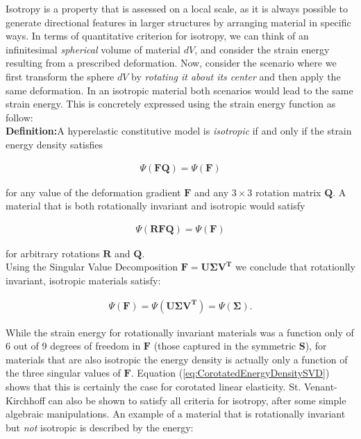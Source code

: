 Isotropy is a property that is assessed on a local scale, as it is always possible to generate directional features in larger structures by 
arranging material in specific ways. In terms of quantitative criterion for isotropy, we can think of an infinitesimal \textit{spherical} 
volume of material $dV$, and consider the strain energy resulting from a prescribed deformation. Now, consider the scenario where we first 
transform the sphere $dV$ by \textit{rotating it about its center} and then apply the same deformation. In an isotropic material both
scenarios would lead to the same strain energy. This is concretely expressed using the strain energy function as follow:\\

\textbf{Definition:}A hyperelastic constitutive model is \textit{isotropic} if and only if the strain energy density satisfies

\begin{gather*}
 \Psi(\boldsymbol{FQ}) = \Psi(\boldsymbol{F})
\end{gather*}

for any value of the deformation gradient $\boldsymbol{F}$ and any $3 \times 3$ rotation matrix $\boldsymbol{Q}$. A material that is both 
rotationally invariant and isotropic would satisfy

\begin{gather*}
 \Psi(\boldsymbol{RFQ})=\Psi(\boldsymbol{F})
\end{gather*}

for arbitrary rotations $\boldsymbol{R}$ and $\boldsymbol{Q}$.\\

Using the Singular Value Decomposition $\boldsymbol{F} = \boldsymbol{U\Sigma V^T}$ we conclude that rotationlly invariant, isotropic materials satisfy:

\begin{gather*}
 \Psi(\boldsymbol{F})=\Psi(\boldsymbol{U\Sigma V^T}) = \Psi(\boldsymbol{\Sigma}).
\end{gather*}

While the strain energy for rotationally invariant materials was a function only of 6 out of 9 degrees of freedom in $\boldsymbol{F}$ (those 
captured in the symmetric $\boldsymbol{S}$), for materials that are also isotropic the energy density is actually only a function of the three 
singular values of $\boldsymbol{F}$. Equation (\ref{eq:CorotatedEnergyDensitySVD}) shows that this is certainly the case for corotated linear 
elasticity. St. Venant-Kirchhoff can also be shown to satisfy all criteria for isotropy, after some simple algebraic manipulations. An example 
of a material that is rotationally invariant but \textit{not} isotropic is described by the energy:

